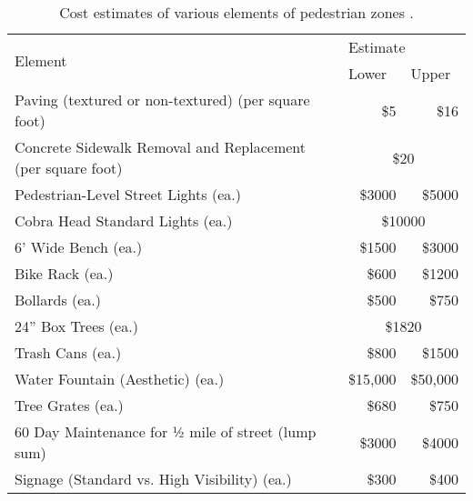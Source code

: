 \begin{table}[h]
\centering
\begin{tabular}{@{}lrr@{}}
\toprule
\multirow{2}{*}{Element}                  & \multicolumn{2}{l}{Estimate}                          \\ \cmidrule(l){2-3} 
                                          & \multicolumn{1}{l}{Lower} & \multicolumn{1}{l}{Upper} \\
\midrule

Paving (textured or non-textured) (per square foot)         & \$5                   & \$16                  \\

Concrete Sidewalk Removal and Replacement (per square foot) & \multicolumn{2}{c}{\$20}                          \\


Pedestrian-Level Street Lights (ea.)            & \$3000                & \$5000                 \\
Cobra Head Standard Lights (ea.)               & \multicolumn{2}{c}{\$10000}                       \\
6’ Wide Bench (ea.)                           & \$1500                & \$3000                \\
Bike Rack (ea.)                                 & \$600                 & \$1200                 \\
Bollards (ea.)                                  & \$500                  & \$750                 \\
24” Box Trees (ea.)                             & \multicolumn{2}{c}{\$1820 }                        \\
Trash Cans (ea.)                                & \$800                 & \$1500                 \\
Water Fountain (Aesthetic) (ea.)                & \$15,000               & \$50,000               \\
Tree Grates (ea.)                               & \$680                  & \$750                  \\
60 Day Maintenance for ½ mile of street (lump sum)   & \$3000           & \$4000       \\
Signage (Standard vs. High Visibility) (ea.)    & \$300                & \$400               \\
\bottomrule
\end{tabular}
\caption[Cost estimates of various elements of pedestrian zones]{Cost estimates of various elements of pedestrian zones \cite{PZ3}.}\label{table:pedestrian-zone-costs}
\end{table}